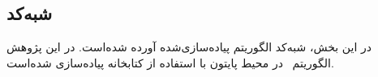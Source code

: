         
        \subsection{شبه‌کد
        }
        
       در این بخش، شبه‌کد الگوریتم
        پیاده‌سازی‌شده آورده شده‌است. در این پژوهش الگوریتم~ در محیط پایتون با استفاده از کتابخانه
          \cite{tensorflow2015-whitepaper}
          پیاده‌سازی شده‌است.
        
%        
        
